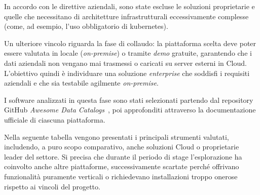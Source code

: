 In accordo con le direttive aziendali, sono state escluse le soluzioni proprietarie e quelle che necessitano di architetture infrastrutturali eccessivamente complesse 
(come, ad esempio, l'uso obbligatorio di \gls{kubernetes}).

Un ulteriore vincolo riguarda la fase di collaudo: la piattaforma scelta deve poter essere valutata in locale (\emph{on-premise}) o tramite \emph{demo} gratuite, 
garantendo che i dati aziendali non vengano mai trasmessi o caricati su server esterni in Cloud. 
L'obiettivo quindi è individuare una soluzione \emph{enterprise} che soddisfi i requisiti aziendali e che sia testabile agilmente \emph{on-premise}.

I software analizzati in questa fase sono stati selezionati partendo dal repository GitHub \emph{Awesome Data Catalogs}~\cite{site:awesome-data-catalogs}, poi approfonditi attraverso la documentazione ufficiale di ciascuna piattaforma.

Nella seguente tabella vengono presentati i principali strumenti valutati, includendo, a puro scopo comparativo, anche soluzioni 
Cloud o proprietarie leader del settore. Si precisa che durante il periodo di stage l'esplorazione ha coinvolto anche altre piattaforme, successivamente 
scartate perché offrivano funzionalità puramente verticali o richiedevano installazioni troppo onerose rispetto ai vincoli del progetto.

